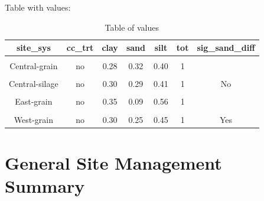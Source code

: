 \documentclass[
]{article}
\begin{document}
Table with values:

\begin{table}[H]

\caption{\label{tab:texture2}Table of values}
\centering
\begin{tabular}[t]{ccccccc}
\toprule
site\_sys & cc\_trt & clay & sand & silt & tot & sig\_sand\_diff\\
\midrule
\cellcolor{gray!6}{} & \cellcolor{gray!6}{cc} & \cellcolor{gray!6}{0.28} & \cellcolor{gray!6}{0.32} & \cellcolor{gray!6}{0.40} & \cellcolor{gray!6}{1} & \cellcolor{gray!6}{}\\

\multirow{-2}{*}{\centering\arraybackslash Central-grain} & no & 0.28 & 0.32 & 0.40 & 1 & \\

\cellcolor{gray!6}{} & \cellcolor{gray!6}{cc} & \cellcolor{gray!6}{0.29} & \cellcolor{gray!6}{0.30} & \cellcolor{gray!6}{0.41} & \cellcolor{gray!6}{1} & \cellcolor{gray!6}{}\\

\multirow{-2}{*}{\centering\arraybackslash Central-silage} & no & 0.30 & 0.29 & 0.41 & 1 & \multirow{-4}{*}{\centering\arraybackslash No}\\
\cmidrule{1-7}
\cellcolor{gray!6}{} & \cellcolor{gray!6}{cc} & \cellcolor{gray!6}{0.32} & \cellcolor{gray!6}{0.12} & \cellcolor{gray!6}{0.56} & \cellcolor{gray!6}{1} & \cellcolor{gray!6}{}\\

\multirow{-2}{*}{\centering\arraybackslash East-grain} & no & 0.35 & 0.09 & 0.56 & 1 & \\

\cellcolor{gray!6}{} & \cellcolor{gray!6}{cc} & \cellcolor{gray!6}{0.27} & \cellcolor{gray!6}{0.31} & \cellcolor{gray!6}{0.42} & \cellcolor{gray!6}{1} & \cellcolor{gray!6}{}\\

\multirow{-2}{*}{\centering\arraybackslash West-grain} & no & 0.30 & 0.25 & 0.45 & 1 & \multirow{-4}{*}{\centering\arraybackslash Yes}\\
\bottomrule
\end{tabular}
\end{table}

\hypertarget{general-site-management-summary}{%
\section{General Site Management
Summary}\label{general-site-management-summary}}
\end{document}
